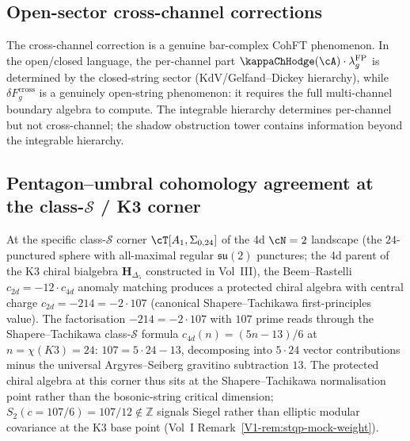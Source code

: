 \subsection{Open-sector cross-channel corrections}

The cross-channel correction is a genuine bar-complex CohFT
phenomenon. In the open/closed language, the per-channel
part $\kappaChHodge(\cA) \cdot \lambda_g^{\mathrm{FP}}$ is determined by the
closed-string sector (KdV/Gelfand--Dickey hierarchy), while
$\delta F_g^{\mathrm{cross}}$ is a genuinely open-string
phenomenon: it requires the full multi-channel boundary algebra
to compute. The integrable hierarchy determines per-channel
but not cross-channel; the shadow obstruction tower contains
information beyond the integrable hierarchy.

\subsection{Pentagon--umbral cohomology agreement at the class-$\mathcal{S}$ / K3 corner}
\label{subsec:vol2-pentagon-umbral-note}

At the specific class-$\mathcal S$ corner
$\cT[A_1,\Sigma_{0,24}]$ of the 4d $\cN=2$ landscape (the
$24$-punctured sphere with all-maximal regular
$\mathfrak{su}(2)$ punctures; the 4d parent of the K3 chiral
bialgebra $\mathbf H_{\Delta_5}$ constructed in Vol~III), the
Beem--Rastelli $c_{2d} = -12\cdot c_{4d}$ anomaly matching
produces a protected chiral algebra with central charge
$c_{2d} = -214 = -2\cdot 107$ (canonical Shapere--Tachikawa
first-principles value).
The factorisation $-214 = -2\cdot 107$ with $107$ prime reads
through the Shapere--Tachikawa class-$\mathcal S$ formula
$c_{4d}(n) = (5n - 13)/6$ at $n = \chi(K3) = 24$:
$107 = 5\cdot 24 - 13$, decomposing into $5\cdot 24$ vector
contributions minus the universal Argyres--Seiberg gravitino
subtraction $13$. The protected chiral algebra at this corner
thus sits at the Shapere--Tachikawa normalisation point rather
than the bosonic-string critical dimension;
$S_2(c = 107/6) = 107/12 \notin \mathbb Z$ signals Siegel rather
than elliptic modular covariance at the K3 base point
(Vol~I Remark~\ref{V1-rem:stqp-mock-weight}).

